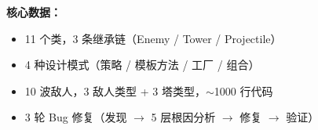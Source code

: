 \documentclass[12pt,a4paper]{ctexart}
\begin{document}
\vspace{0.5em}
\textbf{核心数据：}
\begin{itemize}[noitemsep]
    \item 11 个类，3 条继承链（Enemy / Tower / Projectile）
    \item 4 种设计模式（策略 / 模板方法 / 工厂 / 组合）
    \item 10 波敌人，3 敌人类型 + 3 塔类型，$\sim$1000 行代码
    \item 3 轮 Bug 修复（发现 $\rightarrow$ 5 层根因分析 $\rightarrow$ 修复 $\rightarrow$ 验证）
\end{itemize}
\end{document}
